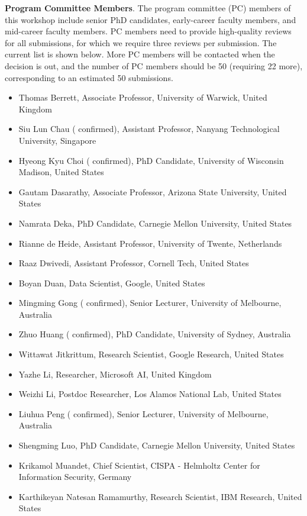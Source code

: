\documentclass{article}
\begin{document}
\textbf{Program Committee Members}. The program committee (PC) members of this workshop include senior PhD candidates, early-career faculty members, and mid-career faculty members. PC members need to provide high-quality reviews for all submissions, for which we require three reviews per submission. The current list is shown below. More PC members will be contacted when the decision is out, and the number of PC members should be 50 (requiring 22 more), corresponding to an estimated 50 submissions.
\begin{itemize}[leftmargin=10pt,nosep]
\item Thomas Berrett, Associate Professor, University of Warwick, United Kingdom
\item Siu Lun Chau ({\color{blue} confirmed}), Assistant Professor, Nanyang Technological University, Singapore
\item Hyeong Kyu Choi ({\color{blue} confirmed}), PhD Candidate, University of Wisconsin Madison, United States
\item Gautam Dasarathy, Associate Professor, Arizona State University, United States
\item Namrata Deka, PhD Candidate, Carnegie Mellon University, United States
\item Rianne de Heide, Assistant Professor, University of Twente, Netherlands
\item Raaz Dwivedi, Assistant Professor, Cornell Tech, United States
\item Boyan Duan, Data Scientist, Google, United States
\item Mingming Gong ({\color{blue} confirmed}), Senior Lecturer, University of Melbourne, Australia
\item Zhuo Huang ({\color{blue} confirmed}), PhD Candidate, University of Sydney, Australia
\item Wittawat Jitkrittum, Research Scientist, Google Research, United States
\item Yazhe Li, Researcher, Microsoft AI, United Kingdom
\item Weizhi Li, Postdoc Researcher, Los Alamos National Lab, United States
\item Liuhua Peng ({\color{blue} confirmed}), Senior Lecturer, University of Melbourne, Australia
\item Shengming Luo, PhD Candidate, Carnegie Mellon University, United States
\item Krikamol Muandet, Chief Scientist, CISPA - Helmholtz Center for Information Security, Germany
\item Karthikeyan Natesan Ramamurthy, Research Scientist, IBM Research, United States

\end{itemize}
\end{document}
